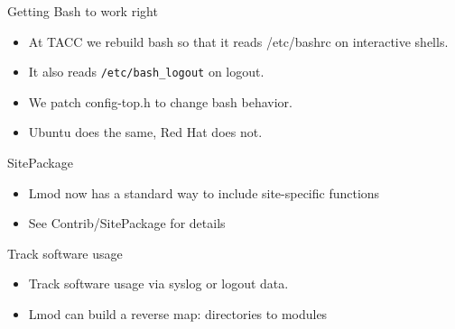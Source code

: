 \documentclass{beamer}
\begin{document}
\begin{frame}{Getting Bash to work right}
  \begin{itemize}
    \item At TACC we rebuild bash so that it reads /etc/bashrc on
      interactive shells.
    \item It also reads \texttt{/etc/bash\_logout} on logout.
    \item We patch config-top.h to change bash behavior.
    \item Ubuntu does the same, Red Hat does not.
  \end{itemize}
\end{frame}

\begin{frame}{SitePackage}
  \begin{itemize}
    \item Lmod now has a standard way to include site-specific functions
    \item See Contrib/SitePackage for details
  \end{itemize}
\end{frame}


\begin{frame}{Track software usage}
  \begin{itemize}
    \item Track software usage via syslog or logout data.
    \item Lmod can build a reverse map: directories to modules
  \end{itemize}
\end{frame}

\end{document}
